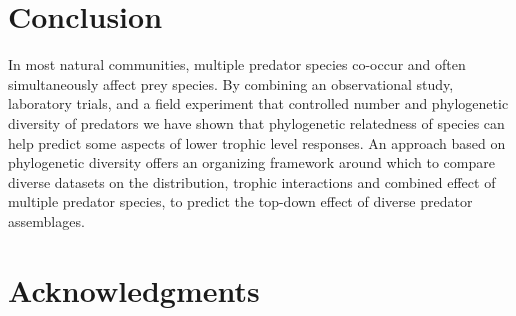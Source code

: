 \documentclass[11pt]{article}
\begin{document}
\section*{Conclusion}

In most natural communities, multiple predator species co-occur and
often simultaneously affect prey species. By combining an observational
study, laboratory trials, and a field experiment that controlled number
and phylogenetic diversity of predators we have shown that phylogenetic
relatedness of species can help predict some aspects of lower trophic
level responses. An approach based on phylogenetic diversity offers an
organizing framework around which to compare diverse datasets on the
distribution, trophic interactions and combined effect of multiple
predator species, to predict the top-down effect of diverse predator
assemblages.


\section*{Acknowledgments}


\newpage{}




\end{document}
